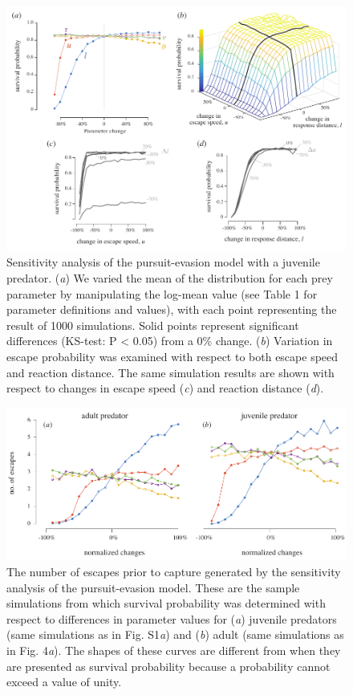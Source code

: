 \documentclass[11pt]{article}
\begin{document}
\linespread{1}\selectfont %


\begin{figure}[!h]
\centering
	\includegraphics[width=5.5in]{supp_sense}
\caption{Sensitivity analysis of the pursuit-evasion model with a juvenile predator. 
(\textit{a}) We varied the mean of the distribution for each prey parameter by manipulating the log-mean value (see Table 1 for parameter definitions and values), with each point representing the result of 1000 simulations. 
Solid points represent significant differences (KS-test: P < 0.05) from a 0\% change.
(\textit{b}) Variation in escape probability was examined with respect to both escape speed and reaction distance.
The same simulation results are shown with respect to changes in escape speed (\textit{c}) and reaction distance (\textit{d}).
}
\label{fig_sense}
\end{figure}

\begin{figure}[!h]
\centering
	\includegraphics[width=5.5in]{supp_noescape}
\caption{The number of escapes prior to capture generated by the sensitivity analysis of the pursuit-evasion model.
These are the sample simulations from which survival probability was determined with respect to differences in parameter values for (\textit{a}) juvenile predators (same simulations as in Fig. S1\textit{a}) and (\textit{b}) adult (same simulations as in Fig. 4\textit{a}).
The shapes of these curves are different from when they are presented as survival probability because a probability cannot exceed a value of unity.
}
\label{fig_sense}
\end{figure}
\end{document}
